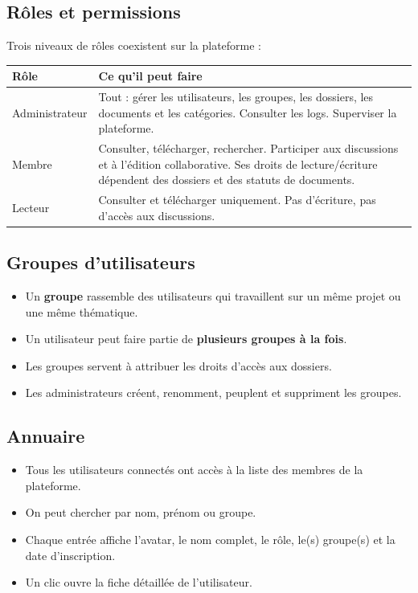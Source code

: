 \documentclass[a4paper,12pt,french]{article}
\begin{document}
\subsection{Rôles et permissions}

Trois niveaux de rôles coexistent sur la plateforme :

\begin{tabularx}{\textwidth}{l X}
\toprule
\textbf{Rôle} & \textbf{Ce qu'il peut faire} \\
\midrule
Administrateur & Tout : gérer les utilisateurs, les groupes, les dossiers, les documents et les catégories. Consulter les logs. Superviser la plateforme. \\
\addlinespace
Membre & Consulter, télécharger, rechercher. Participer aux discussions et à l'édition collaborative. Ses droits de lecture/écriture dépendent des dossiers et des statuts de documents. \\
\addlinespace
Lecteur & Consulter et télécharger uniquement. Pas d'écriture, pas d'accès aux discussions. \\
\bottomrule
\end{tabularx}

\subsection{Groupes d'utilisateurs}

\begin{itemize}[leftmargin=1.5em]
  \item Un \textbf{groupe} rassemble des utilisateurs qui travaillent sur un même projet ou une même thématique.
  \item Un utilisateur peut faire partie de \textbf{plusieurs groupes à la fois}.
  \item Les groupes servent à attribuer les droits d'accès aux dossiers.
  \item Les administrateurs créent, renomment, peuplent et suppriment les groupes.
\end{itemize}

\subsection{Annuaire}

\begin{itemize}[leftmargin=1.5em]
  \item Tous les utilisateurs connectés ont accès à la liste des membres de la plateforme.
  \item On peut chercher par nom, prénom ou groupe.
  \item Chaque entrée affiche l'avatar, le nom complet, le rôle, le(s) groupe(s) et la date d'inscription.
  \item Un clic ouvre la fiche détaillée de l'utilisateur.
\end{itemize}
\end{document}
